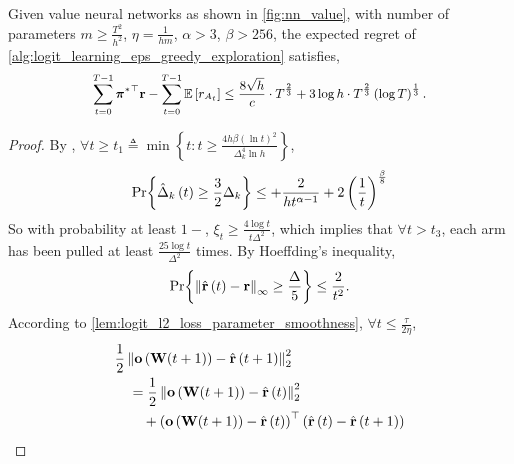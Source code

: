 \begin{thm}
\label{thm:logit_learning_main_result}
    Given value neural networks as shown in \cref{fig:nn_value}, with number of parameters $m \ge \frac{T^2}{h^2}$, $\eta = \frac{1}{h m}$, $\alpha > 3$, $\beta > 256$, the expected regret of \cref{alg:logit_learning_eps_greedy_exploration} satisfies,
\begin{equation*}
\small
\begin{split}
    \sum\limits_{t=0}^{T-1}{ {\rvpi^*}^\top \rvr } - \sum\limits_{t=0}^{T-1}{ \sE \left[ r_{A_t} \right] } \le \frac{8 \sqrt{h}}{c} \cdot T^{\frac{2}{3}} + 3 \log{h} \cdot T^{\frac{2}{3}} \left(\log{T}\right)^{\frac{1}{3}}.
\end{split}
\end{equation*}
\end{thm}
\begin{proof}
    By \citep{seldin2017improved},
    $\forall t \ge t_1 \triangleq \min{\left\{ t : t \ge \frac{4 h \beta \left(\ln{t}\right)^2}{\Delta_k^4 \ln{h}} \right\}}$,
\begin{equation*}
\begin{split}
    {\text{Pr}}{\left\{ \hat{\Delta}_k\left(t\right) \ge \frac{3}{2} \Delta_k \right\}} \le + \frac{2}{h t^{\alpha - 1}} + 2 \left(\frac{1}{t}\right)^{\frac{\beta}{8}}
\end{split}
\end{equation*}
So with probability at least $1 - $, $\xi_t \ge \frac{4 \log{t}}{t \Delta^2}$, which implies that $\forall t > t_3$,  each arm has been pulled at least $\frac{25\log{t}}{\Delta^2}$ times. By Hoeffding's inequality,
\begin{equation*}
\begin{split}
    {\text{Pr}}{\left\{ \left\| \hat{{\mathbf{r}}}\left(t\right) - {\mathbf{r}}\right\|_\infty \ge \frac{\Delta}{5} \right\}} \le \frac{2}{t^2}.
\end{split}
\end{equation*}
According to \cref{lem:logit_l2_loss_parameter_smoothness}, $\forall t \le \frac{\tau}{2 \eta}$,
\begin{equation*}
\begin{split}
    &\frac{1}{2} \left\| \rvo\left( \rmW(t+1) \right) - \hat{\rvr}\left(t+1\right)\right\|_2^2 \\
    &\quad = \frac{1}{2} \left\| \rvo\left( \rmW(t+1) \right) - \hat{\rvr}\left(t\right)\right\|_2^2 \\
    &\qquad + \left( \rvo\left( \rmW(t+1) \right) - \hat{\rvr}\left(t\right) \right)^\top \left( \hat{\rvr}\left(t\right) - \hat{\rvr}\left(t+1\right) \right) \\

\end{split}
\end{equation*}
\end{proof}
